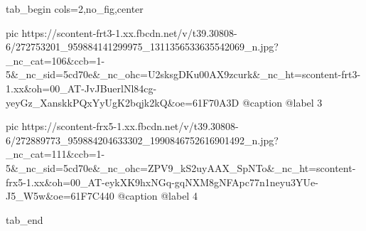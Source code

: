  
 
 
 
 


\ifcmt
  tab_begin cols=2,no_fig,center

     pic https://scontent-frt3-1.xx.fbcdn.net/v/t39.30808-6/272753201_959884141299975_1311356533635542069_n.jpg?_nc_cat=106&ccb=1-5&_nc_sid=5cd70e&_nc_ohc=U2sksgDKu00AX9zcurk&_nc_ht=scontent-frt3-1.xx&oh=00_AT-JvJBuerlNl84cg-yeyGz_XanskkPQxYyUgK2bqjk2kQ&oe=61F70A3D
     @caption @label 3

     pic https://scontent-frx5-1.xx.fbcdn.net/v/t39.30808-6/272889773_959884204633302_1990846752616901492_n.jpg?_nc_cat=111&ccb=1-5&_nc_sid=5cd70e&_nc_ohc=ZPV9_kS2uyAAX_SpNTo&_nc_ht=scontent-frx5-1.xx&oh=00_AT-eykXK9hxNGq-gqNXM8gNFApc77n1neyu3YUe-J5_W5w&oe=61F7C440
     @caption @label 4

  tab_end
\fi
